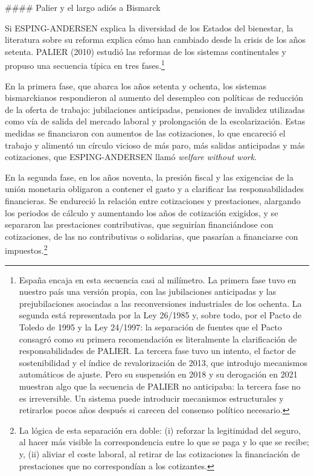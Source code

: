 \documentclass[10pt,a4paper]{article}
\begin{document}
#### Palier y el largo adiós a Bismarck

Si ESPING-ANDERSEN explica la diversidad de los Estados del bienestar, la literatura sobre su reforma explica cómo han cambiado desde la crisis de los años setenta. PALIER (2010) estudió las reformas de los sistemas continentales y propuso una secuencia típica en tres fases.\footnote{%
    España encaja en esta secuencia casi al milímetro. La primera fase tuvo en nuestro país una versión propia, con las jubilaciones anticipadas y las prejubilaciones asociadas a las reconversiones industriales de los ochenta. La segunda está representada por la Ley 26/1985 y, sobre todo, por el Pacto de Toledo de 1995 y la Ley 24/1997: la separación de fuentes que el Pacto consagró como su primera recomendación es literalmente la clarificación de responsabilidades de PALIER. La tercera fase tuvo un intento, el factor de sostenibilidad y el índice de revalorización de 2013, que introdujo mecanismos automáticos de ajuste. Pero su suspensión en 2018 y su derogación en 2021 muestran algo que la secuencia de PALIER no anticipaba: la tercera fase no es irreversible. Un sistema puede introducir mecanismos estructurales y retirarlos pocos años después si carecen del consenso político necesario.
}

En la primera fase, que abarca los años setenta y ochenta, los sistemas bismarckianos respondieron al aumento del desempleo con políticas de reducción de la oferta de trabajo: jubilaciones anticipadas, pensiones de invalidez utilizadas como vía de salida del mercado laboral y prolongación de la escolarización. Estas medidas se financiaron con aumentos de las cotizaciones, lo que encareció el trabajo y alimentó un círculo vicioso de más paro, más salidas anticipadas y más cotizaciones, que ESPING-ANDERSEN llamó \textit{welfare without work}. 

En la segunda fase, en los años noventa, la presión fiscal y las exigencias de la unión monetaria obligaron a contener el gasto y a clarificar las responsabilidades financieras. Se endureció la relación entre cotizaciones y prestaciones, alargando los periodos de cálculo y aumentando los años de cotización exigidos, y se separaron las prestaciones contributivas, que seguirían financiándose con cotizaciones, de las no contributivas o solidarias, que pasarían a financiarse con impuestos.\footnote{%
    La lógica de esta separación era doble: (i) reforzar la legitimidad del seguro, al hacer más visible la correspondencia entre lo que se paga y lo que se recibe; y, (ii) aliviar el coste laboral, al retirar de las cotizaciones la financiación de prestaciones que no correspondían a los cotizantes.
} 
\end{document}

